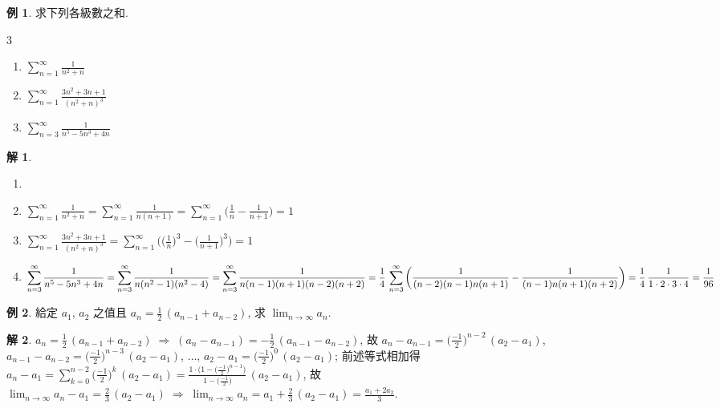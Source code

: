 \documentclass[12pt]{extarticle}
\newcommand{\ds}{\displaystyle}
\newcommand{\ie}{\;\Longrightarrow\;}
\theoremstyle{definition}
\newtheorem*{ex}{例}
\newtheorem*{sol}{解}
\newcommand{\myline}{\noindent\makebox[\linewidth]{\rule{\paperwidth}{0.4pt}}}
\begin{document}
\begin{ex} 求下列各級數之和. 
  \begin{multicols}{3}
    \begin{enumerate}\setlength{\itemsep}{0pt}
      \item $\ds\sum_{n = 1}^\infty\frac{1}{n^2 + n}$
      \item $\ds\sum_{n = 1}^\infty\frac{3n^2 + 3n + 1}{(n^2 + n)^3}$
      \item $\ds\sum_{n = 3}^\infty\frac{1}{n^5 - 5n^3 + 4n}$
    \end{enumerate}
  \end{multicols}
\end{ex}

\begin{sol}
  \begin{enumerate}\setlength{\itemsep}{0pt}
    \item[]
    \item $\ds\sum_{n = 1}^\infty\frac{1}{n^2 + n} = \sum_{n = 1}^\infty\frac{1}{n(n + 1)} = \sum_{n = 1}^\infty\Big(\frac{1}{n} - \frac{1}{n + 1}\Big) = 1$
    \item $\ds\sum_{n = 1}^\infty\frac{3n^2 + 3n + 1}{(n^2 + n)^3} = \sum_{n = 1}^\infty\bigg(\Big(\frac{1}{n}\Big)^3 - \Big(\frac{1}{n + 1}\Big)^3\bigg) = 1$
    \item $\ds\sum_{n = 3}^\infty\frac{1}{n^5 - 5n^3 + 4n} = \sum_{n = 3}^\infty\frac{1}{n(n^2 - 1)(n^2 - 4)} = \sum_{n = 3}^\infty\frac{1}{n(n - 1)(n + 1)(n - 2)(n + 2)} \\= \frac{1}{4}\,\sum_{n = 3}^\infty\bigg(\frac{1}{(n - 2)(n - 1)n(n + 1)} - \frac{1}{(n - 1)n(n + 1)(n + 2)}\bigg) = \frac{1}{4}\,\frac{1}{1\cdot2\cdot3\cdot4} = \frac{1}{96}$
  \end{enumerate}
\end{sol}

\myline

\begin{ex}
  給定 $a_1$, $a_2$ 之值且 $\ds a_n = \frac{1}{2}\,(a_{n - 1} + a_{n - 2})$, 求 $\ds\lim_{n\to\infty}a_n$. 
\end{ex}

\begin{sol}
  $\ds a_n = \frac{1}{2}\,(a_{n - 1} + a_{n - 2}) \ie (a_n - a_{n - 1}) = -\frac{1}{2}\,(a_{n - 1} - a_{n - 2})$, 故 $\ds a_n - a_{n - 1} = \Big(\frac{-1}{2}\Big)^{n - 2}\,(a_2 - a_1)$, $\ds a_{n - 1} - a_{n - 2} = \Big(\frac{-1}{2}\Big)^{n - 3}\,(a_2 - a_1)$, $\ldots$, $\ds a_2 - a_1 = \Big(\frac{-1}{2}\Big)^0\,(a_2 - a_1)$; 前述等式相加得 $\ds a_n - a_1 = \sum_{k = 0}^{n - 2}\Big(\frac{-1}{2}\Big)^k\,(a_2 - a_1) = \frac{1\cdot\big(1 - \big(\frac{-1}{2}\big)^{n - 1}\big)}{1 - \big(\frac{-1}{2}\big)}\,(a_2 - a_1)$, 故 $\ds \lim_{n\to\infty} a_n - a_1 = \frac{2}{3}\,(a_2 - a_1) \ie \lim_{n\to\infty} a_n = a_1 + \frac{2}{3}\,(a_2 - a_1) = \frac{a_1 + 2 a_2}{3}$.  
\end{sol}
\end{document}
